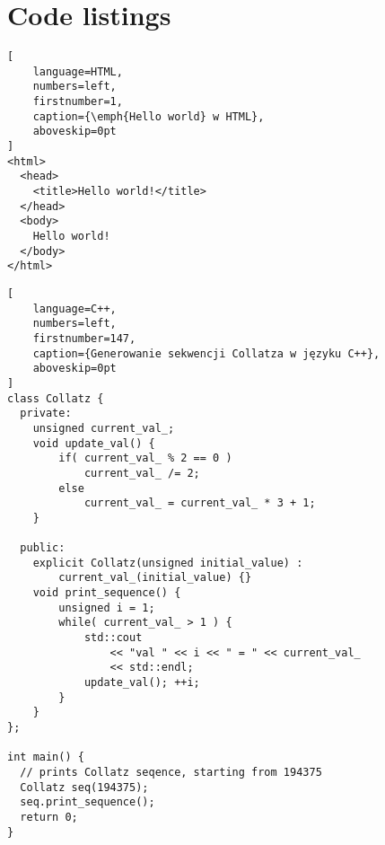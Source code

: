 \newpage %
\section{Code listings}

\lipsum[10]
\begin{addmargin}[6mm]{0mm}
\begin{lstlisting}[
    language=HTML,
    numbers=left,
    firstnumber=1,
    caption={\emph{Hello world} w HTML},
    aboveskip=0pt
]
<html>
  <head>
    <title>Hello world!</title>
  </head>
  <body>
    Hello world!
  </body>
</html>
\end{lstlisting}
\end{addmargin}

\lipsum[11]
\begin{addmargin}[10mm]{0mm}
\begin{lstlisting}[
    language=C++,
    numbers=left,
    firstnumber=147,
    caption={Generowanie sekwencji Collatza w języku C++},
    aboveskip=0pt
]
class Collatz {
  private:
    unsigned current_val_;
    void update_val() {
        if( current_val_ % 2 == 0 )
            current_val_ /= 2;
        else
            current_val_ = current_val_ * 3 + 1;
    }

  public:
    explicit Collatz(unsigned initial_value) : 
        current_val_(initial_value) {}
    void print_sequence() {
        unsigned i = 1;
        while( current_val_ > 1 ) {
            std::cout
                << "val " << i << " = " << current_val_
                << std::endl;
            update_val(); ++i;
        }
    }
};

int main() {
  // prints Collatz seqence, starting from 194375
  Collatz seq(194375);
  seq.print_sequence();
  return 0;
}
\end{lstlisting}
\end{addmargin}

\lipsum[12]
